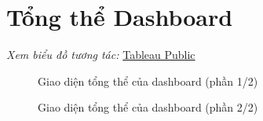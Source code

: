 \section{Tổng thể Dashboard}

\noindent\small\textit{Xem biểu đồ tương tác: }\href{https://public.tableau.com/app/profile/duy.le4605/viz/Group10_17788537028430/Dashboard1?publish=yes
}{Tableau Public}\normalsize

\begin{figure}[p]
    \centering
    \caption{Giao diện tổng thể của dashboard (phần 1/2)}
    \label{fig:dashboard-overview}
\end{figure}



\begin{figure}[p]
    \centering
    \caption*{Giao diện tổng thể của dashboard (phần 2/2)}
\end{figure}
\clearpage